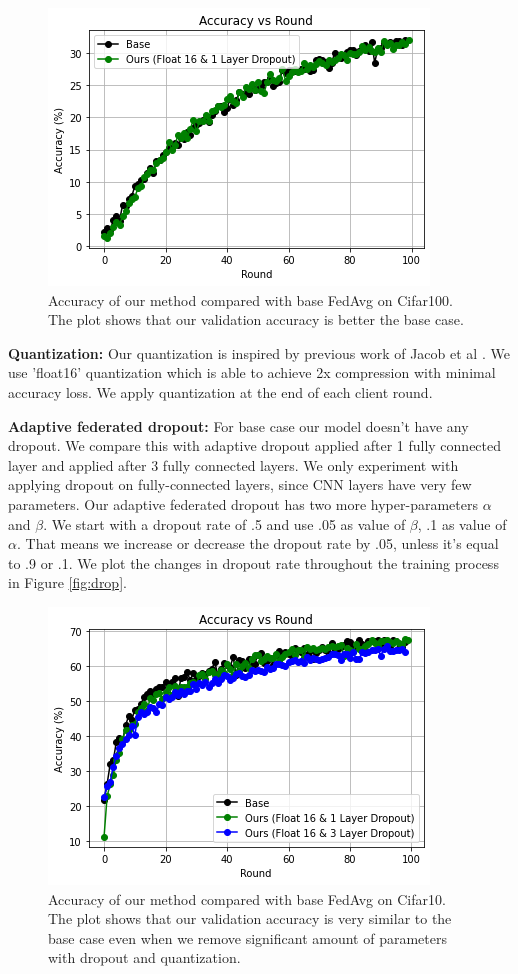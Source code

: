 \documentclass{article}
\begin{document}
\begin{figure}
  \centering
\includegraphics[width = .5\linewidth, height = .4\linewidth]{img/Acc_Cifar100.png}
\caption{Accuracy of our method compared with base FedAvg on Cifar100. The plot shows that our validation accuracy is better the base case.}
  \label{fig:cifar100}
\end{figure}

\textbf{Quantization: } Our quantization is inspired by previous work of Jacob et al \cite{jacob2018quantization}. We use 'float16' quantization which is able to achieve 2x compression with minimal accuracy loss. We apply quantization at the end of each client round.

\textbf{Adaptive federated dropout: } For base case our model doesn't have any dropout. We compare this with adaptive dropout applied after 1 fully connected layer and applied after 3 fully connected layers. We only experiment with applying dropout on fully-connected layers, since CNN layers have very few parameters. Our adaptive federated dropout has two more hyper-parameters $\alpha$ and $\beta$. We start with a dropout rate of .5 and use .05 as value of $\beta$, .1 as value of $\alpha$. That means we increase or decrease the dropout rate by .05, unless it's equal to .9 or .1. We plot the changes in dropout rate throughout the training process in Figure \ref{fig:drop}.

\begin{figure}
  \centering
\includegraphics[width = .5\linewidth, height = .4\linewidth]{img/Acc_Cifar10.png}
\caption{Accuracy of our method compared with base FedAvg on Cifar10. The plot shows that our validation accuracy is very similar to the base case even when we remove significant amount of parameters with dropout and quantization.}
  \label{fig:fed_cifar}
\end{figure}
\end{document}
